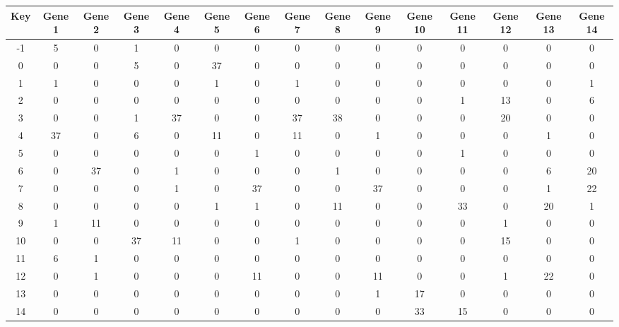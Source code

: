 \begin{tabular}{|c|c|c|c|c|c|c|c|c|c|c|c|c|c|c|}
\hline
Key & Gene 1 & Gene 2 & Gene 3 & Gene 4 & Gene 5 & Gene 6 & Gene 7 & Gene 8 & Gene 9 & Gene 10 & Gene 11 & Gene 12 & Gene 13 & Gene 14 \\
\hline
-1 & 5 & 0 & 1 & 0 & 0 & 0 & 0 & 0 & 0 & 0 & 0 & 0 & 0 & 0 \\
0 & 0 & 0 & 5 & 0 & 37 & 0 & 0 & 0 & 0 & 0 & 0 & 0 & 0 & 0 \\
1 & 1 & 0 & 0 & 0 & 1 & 0 & 1 & 0 & 0 & 0 & 0 & 0 & 0 & 1 \\
2 & 0 & 0 & 0 & 0 & 0 & 0 & 0 & 0 & 0 & 0 & 1 & 13 & 0 & 6 \\
3 & 0 & 0 & 1 & 37 & 0 & 0 & 37 & 38 & 0 & 0 & 0 & 20 & 0 & 0 \\
4 & 37 & 0 & 6 & 0 & 11 & 0 & 11 & 0 & 1 & 0 & 0 & 0 & 1 & 0 \\
5 & 0 & 0 & 0 & 0 & 0 & 1 & 0 & 0 & 0 & 0 & 1 & 0 & 0 & 0 \\
6 & 0 & 37 & 0 & 1 & 0 & 0 & 0 & 1 & 0 & 0 & 0 & 0 & 6 & 20 \\
7 & 0 & 0 & 0 & 1 & 0 & 37 & 0 & 0 & 37 & 0 & 0 & 0 & 1 & 22 \\
8 & 0 & 0 & 0 & 0 & 1 & 1 & 0 & 11 & 0 & 0 & 33 & 0 & 20 & 1 \\
9 & 1 & 11 & 0 & 0 & 0 & 0 & 0 & 0 & 0 & 0 & 0 & 1 & 0 & 0 \\
10 & 0 & 0 & 37 & 11 & 0 & 0 & 1 & 0 & 0 & 0 & 0 & 15 & 0 & 0 \\
11 & 6 & 1 & 0 & 0 & 0 & 0 & 0 & 0 & 0 & 0 & 0 & 0 & 0 & 0 \\
12 & 0 & 1 & 0 & 0 & 0 & 11 & 0 & 0 & 11 & 0 & 0 & 1 & 22 & 0 \\
13 & 0 & 0 & 0 & 0 & 0 & 0 & 0 & 0 & 1 & 17 & 0 & 0 & 0 & 0 \\
14 & 0 & 0 & 0 & 0 & 0 & 0 & 0 & 0 & 0 & 33 & 15 & 0 & 0 & 0 \\
\hline
\end{tabular}